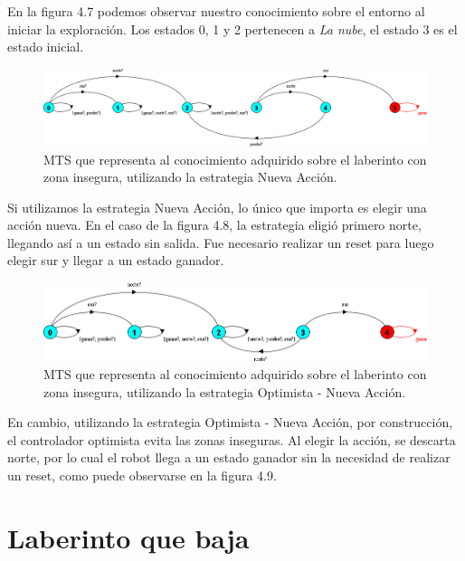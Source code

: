 En la figura 4.7 podemos observar nuestro conocimiento sobre el entorno al iniciar la exploración. Los estados 0, 1 y 2 pertenecen a \textit{La nube}, 
el estado 3 es el estado inicial.

\begin{figure}[H]
	\centering
		\includegraphics[width=1.0\textwidth]{Imagenes/Laberintos/unsafe_nueva_accion.png}
	\caption{MTS que representa al conocimiento adquirido sobre el laberinto con zona insegura, utilizando la estrategia Nueva Acción.}
	\label{fig:unsafe_nueva_accion}
\end{figure}

Si utilizamos la estrategia Nueva Acción, lo único que importa es elegir una acción nueva. En el caso de la figura 4.8, la estrategia eligió primero norte, 
llegando así a un estado sin salida. Fue necesario realizar un reset para luego elegir sur y llegar a un estado ganador.

\begin{figure}[H]
	\centering
		\includegraphics[width=1.0\textwidth]{Imagenes/Laberintos/unsafe_sintesis.png}
	\caption{MTS que representa al conocimiento adquirido sobre el laberinto con zona insegura, utilizando la estrategia Optimista - Nueva Acción.}
	\label{fig:unsafe_sintesis}
\end{figure}

En cambio, utilizando la estrategia Optimista - Nueva Acción, por construcción, el controlador optimista evita las zonas inseguras. Al elegir la acción, 
se descarta norte, por lo cual el robot llega a un estado ganador sin la necesidad de realizar un reset, como puede observarse en la figura 4.9.

\clearpage

\section{Laberinto que baja}

